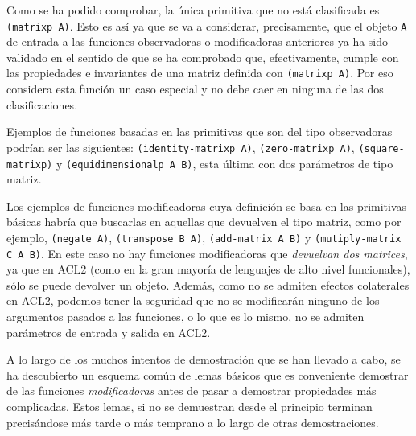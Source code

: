 \documentclass[a4paper,10pt]{article}
\begin{document}
\par \vspace{10pt}

Como se ha podido comprobar, la única primitiva que no está clasificada es \texttt{(matrixp A)}. Esto es así ya que se va a considerar, precisamente, que el objeto \texttt{A} de entrada a las funciones observadoras o modificadoras anteriores ya ha sido validado en el sentido de que se ha comprobado que, efectivamente, cumple con las propiedades e invariantes de una matriz definida con \texttt{(matrixp A)}. Por eso considera esta función un caso especial y no debe caer en ninguna de las dos clasificaciones.

\par \vspace{10pt}

Ejemplos de funciones basadas en las primitivas que son del tipo observadoras podrían ser las siguientes: \texttt{(identity-matrixp A)}, \texttt{(zero-matrixp A)}, \texttt{(square-matrixp)} y \texttt{(equidimensionalp A B)}, esta última con dos parámetros de tipo matriz.

\par \vspace{10pt}

Los ejemplos de funciones modificadoras cuya definición se basa en las primitivas básicas habría que buscarlas en aquellas que devuelven el tipo matriz, como por ejemplo, \texttt{(negate A)}, \texttt{(transpose B A)}, \texttt{(add-matrix A B)} y \texttt{(mutiply-matrix C A B)}. En este caso no hay funciones modificadoras que \emph{devuelvan dos matrices}, ya que en ACL2 (como en la gran mayoría de lenguajes de alto nivel funcionales), sólo se puede devolver un objeto. Además, como no se admiten efectos colaterales en ACL2, podemos tener la seguridad que no se modificarán ninguno de los argumentos pasados a las funciones, o lo que es lo mismo, no se admiten parámetros de entrada y salida en ACL2.

\par \vspace{10pt}

A lo largo de los muchos intentos de demostración que se han llevado a cabo, se ha descubierto un esquema común de lemas básicos que es conveniente demostrar de las funciones \emph{modificadoras} antes de pasar a demostrar propiedades más complicadas. Estos lemas, si no se demuestran desde el principio terminan precisándose más tarde o más temprano a lo largo de otras demostraciones. 
\end{document}
